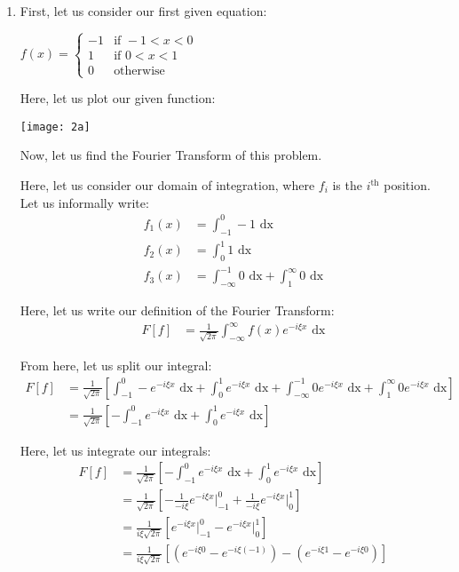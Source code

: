 \begin{enumerate}
  \item First, let us consider our first given equation:

  $\displaystyle
  f(x) =
  \begin{cases}
    -1 & \text{if } -1 < x < 0\\
    1 &  \text{if } 0 < x < 1\\
    0 & \text{otherwise}
  \end{cases}
  $

  Here, let us plot our given function:

  \begin{center}
    \texttt{[image: 2a]}
  \end{center}

  Now, let us find the Fourier Transform of this problem.

  Here, let us consider our domain of integration, where $f_i$ is the $i^{\text{th}}$ position. Let us informally write:
  \begin{align}
    f_1(x) & = \int^0_{-1} -1 \text{ dx}\\
    f_2(x) & = \int^1_0 1 \text{ dx}\\
    f_3(x) & = \int^{-1}_{-\infty} 0 \text{ dx} + \int^\infty_1 0 \text{ dx}
  \end{align}

Here, let us write our definition of the Fourier Transform:
%
\begin{align}
  F[f] & = \frac{1}{\sqrt{2 \pi}} \int^\infty_{-\infty} f(x) e^{-i \xi x} \text{ dx}
\end{align}

From here, let us split our integral:
%
\begin{align}
  F[f]
  & =
  \frac{1}{\sqrt{2 \pi}}
  \left[
    \int^0_{-1} -           e^{-i \xi x}  \text{ dx}
  + \int^1_0                e^{-i \xi x}  \text{ dx}
  + \int^{-1}_{- \infty}  0 e^{-i \xi x}  \text{ dx}
  + \int^\infty_1         0 e^{-i \xi x}  \text{ dx}
  \right]\\
  & =
  \frac{1}{\sqrt{2 \pi}}
  \left[
  - \int^0_{-1} e^{-i \xi x} \text{ dx}
  + \int^1_0    e^{-i \xi x} \text{ dx}
  \right]
\end{align}

Here, let us integrate our integrals:
%
\begin{align}
  F[f]
  & =
  \frac{1}{\sqrt{2 \pi}}
  \left[
  - \int^0_{-1} e^{-i \xi x} \text{ dx}
  + \int^1_0    e^{-i \xi x} \text{ dx}
  \right]\\
  & =
  \frac{1}{\sqrt{2 \pi}}
  \left[
  - \frac{1}{-i \xi} e^{-i \xi x} \Big|^0_{-1}
  + \frac{1}{-i \xi} e^{-i \xi x} \Big|^1_0
  \right]\\
  & =
  \frac{1}{i \xi \sqrt{2 \pi}}
  \left[
    e^{-i \xi x} \Big|^0_{-1}
  - e^{-i \xi x} \Big|^1_0
  \right]\\
  & =
  \frac{1}{i \xi \sqrt{2 \pi}}
  \left[
  \left(
  e^{-i \xi 0} - e^{-i \xi (-1)}
  \right)
  -
  \left(
  e^{-i \xi 1} - e^{-i \xi 0}
  \right)
  \right]\\
\end{align}


\end{enumerate}
